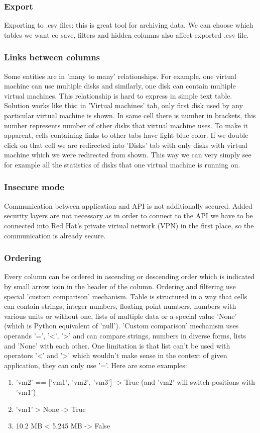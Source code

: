 \subsubsection{Export}
Exporting to .csv files: this is great tool for archiving data. We can choose which tables we want co save, filters and hidden columns also affect exported .csv file.

\subsubsection{Links between columns}
Some entities are in 'many to many' relationships. For example, one virtual machine can use multiple disks and similarly, one disk can contain multiple virtual machines. This relationship is hard to express in simple text table. Solution works like this: in 'Virtual machines' tab, only first disk used by any particular virtual machine is shown. In same cell there is number in brackets, this number represents number of other disks that virtual machine uses. To make it apparent, cells containing links to other tabs have light blue color. If we double click on that cell we are redirected into 'Disks' tab with only disks with virtual machine which we were redirected from shown. This way we can very simply see for example all the statistics of disks that one virtual machine is running on.

\subsubsection{Insecure mode}
Communication between application and API is not additionally secured. Added security layers are not necessary as in order to connect to the API we have to be connected into Red Hat's private virtual network (VPN) in the first place, so the communication is already secure.

\subsubsection{Ordering}
Every column can be ordered in ascending or descending order which is indicated by small arrow icon in the header of the column. Ordering and filtering use special 'custom comparison' mechanism. Table is structured in a way that cells can contain strings, integer numbers, floating point numbers, numbers with various units or without one, lists of multiple data or a special value 'None' (which is Python equivalent of 'null'). 'Custom comparison' mechanism uses operands '=', '<', '>' and can compare strings, numbers in diverse forms, lists and 'None' with each other. One limitation is that list can't be used with operators '<' and '>' which wouldn't make sense in the context of given application, they can only use '='. Here are some examples:
\begin{enumerate}
\item 'vm2' == ['vm1', 'vm2', 'vm3'] -> True (and 'vm2' will switch positions with 'vm1')
\item 'vm1' > None -> True
\item 10.2 MB < 5.245 MB -> False
\end{enumerate}

